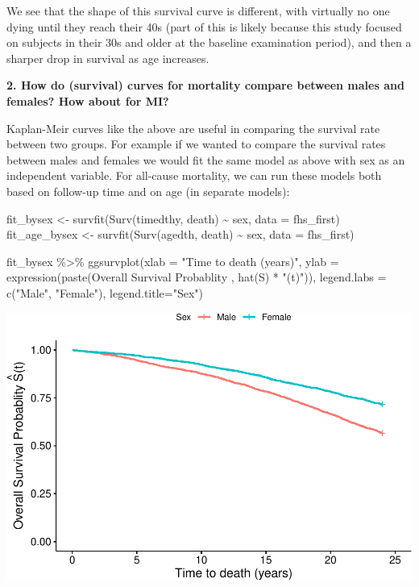 \documentclass[
]{book}
\newenvironment{Shaded}{\begin{snugshade}}{\end{snugshade}}
\newcommand{\AttributeTok}[1]{\textcolor[rgb]{0.77,0.63,0.00}{#1}}
\newcommand{\FunctionTok}[1]{\textcolor[rgb]{0.00,0.00,0.00}{#1}}
\newcommand{\NormalTok}[1]{#1}
\newcommand{\OtherTok}[1]{\textcolor[rgb]{0.56,0.35,0.01}{#1}}
\newcommand{\SpecialCharTok}[1]{\textcolor[rgb]{0.00,0.00,0.00}{#1}}
\newcommand{\StringTok}[1]{\textcolor[rgb]{0.31,0.60,0.02}{#1}}
\begin{document}
We see that the shape of this survival curve is different, with virtually no one dying until they reach their 40s (part of this is likely because this study focused on subjects in their 30s and older at the baseline examination period), and then a sharper drop in survival as age increases.

\textbf{2. How do (survival) curves for mortality compare between males and females? How about for MI?}

Kaplan-Meir curves like the above are useful in comparing the survival rate between two groups. For example if we wanted to compare the survival rates between males and females we would fit the same model as above with sex as an independent variable. For all-cause mortality, we can run these models both based on follow-up time and on age (in separate models):

\begin{Shaded}
\begin{Highlighting}[]
\NormalTok{fit\_bysex }\OtherTok{\textless{}{-}} \FunctionTok{survfit}\NormalTok{(}\FunctionTok{Surv}\NormalTok{(timedthy, death) }\SpecialCharTok{\textasciitilde{}}\NormalTok{ sex, }\AttributeTok{data =}\NormalTok{ fhs\_first)}
\NormalTok{fit\_age\_bysex }\OtherTok{\textless{}{-}} \FunctionTok{survfit}\NormalTok{(}\FunctionTok{Surv}\NormalTok{(agedth, death) }\SpecialCharTok{\textasciitilde{}}\NormalTok{ sex, }\AttributeTok{data =}\NormalTok{ fhs\_first)}

\NormalTok{fit\_bysex }\SpecialCharTok{\%\textgreater{}\%}
  \FunctionTok{ggsurvplot}\NormalTok{(}\AttributeTok{xlab =} \StringTok{"Time to death (years)"}\NormalTok{,}
             \AttributeTok{ylab =} \FunctionTok{expression}\NormalTok{(}\FunctionTok{paste}\NormalTok{(}\StringTok{\textquotesingle{}Overall Survival Probablity \textquotesingle{}}\NormalTok{,}
                                     \FunctionTok{hat}\NormalTok{(S) }\SpecialCharTok{*} \StringTok{"(t)"}\NormalTok{)), }
             \AttributeTok{legend.labs =} \FunctionTok{c}\NormalTok{(}\StringTok{"Male"}\NormalTok{, }\StringTok{"Female"}\NormalTok{),}
  \AttributeTok{legend.title=}\StringTok{"Sex"}\NormalTok{)}
\end{Highlighting}
\end{Shaded}

\includegraphics{adv_epi_analysis_files/figure-latex/unnamed-chunk-203-1.pdf}
\end{document}
